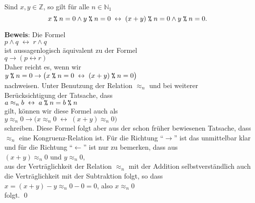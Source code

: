 \begin{Lemma} \label{lemma:modulo1}
Sind $x, y \in \mathbb{Z}$, so gilt f\"{u}r alle $n \in \mathbb{N}_1$
\[ x \;\texttt{\%}\; n = 0 \wedge y \;\texttt{\%}\; n = 0 \;\leftrightarrow\; 
   (x + y) \;\texttt{\%}\; n = 0 \wedge y \;\texttt{\%}\; n = 0. 
\]  
\end{Lemma}
\textbf{Beweis}:  Die Formel
\\[0.2cm]
\hspace*{1.3cm}
$p \wedge q \;\leftrightarrow\; r \wedge q$
\\[0.2cm]
ist aussagenlogisch \"{a}quivalent zu der Formel
\\[0.2cm]
\hspace*{1.3cm}
$q \rightarrow (p \leftrightarrow r)$
\\[0.2cm]
Daher reicht es, wenn wir
\\[0.2cm]
\hspace*{1.3cm}
$y \;\texttt{\%}\; n = 0 \rightarrow \bigl(x \;\texttt{\%}\; n = 0 \;\leftrightarrow\; (x + y) \;\texttt{\%}\; n = 0\bigr)$ 
\\[0.2cm]
nachweisen.  Unter Benutzung der Relation $\approx_n$ und bei weiterer Ber\"{u}cksichtigung
der Tatsache, dass 
\\[0.2cm]
\hspace*{1.3cm}
 $a \approx_n b \;\leftrightarrow\; a \;\texttt{\%}\; n = b \;\texttt{\%}\; n$ 
\\[0.2cm]
gilt, k\"{o}nnen wir diese Formel auch als
\\[0.2cm]
\hspace*{1.3cm}
$y \approx_n 0 \rightarrow \bigl(x \approx_n 0 \;\leftrightarrow\; (x + y) \approx_n 0\bigr)$ 
\\[0.2cm]
schreiben.  Diese Formel folgt aber aus der schon fr\"{u}her bewiesenen Tatsache, dass
$\approx_n$ eine Kongruenz-Relation ist.  F\"{u}r die Richtung ``$\rightarrow$'' ist das
unmittelbar klar und f\"{u}r die Richtung ``$\leftarrow$'' ist nur zu bemerken, dass aus
\\[0.2cm]
\hspace*{1.3cm}
$(x + y) \approx_n 0$ \quad und \quad $y \approx_n 0$, 
\\[0.2cm]
aus der Vertr\"{a}glichkeit der Relation $\approx_n$ mit der Addition selbstverst\"{a}ndlich auch
die Vertr\"{a}glichkeit mit der Subtraktion folgt, so dass
\\[0.2cm]
\hspace*{1.3cm}
$x = (x + y) - y \approx_n 0 - 0 = 0$, \quad also $x \approx_n 0$
\\[0.2cm]
folgt. \qed


